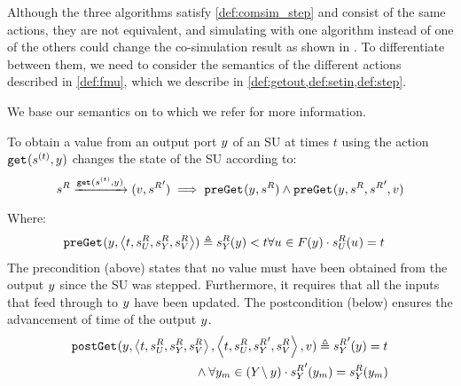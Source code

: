 Although the three algorithms satisfy \cref{def:comsim_step} and consist of the same actions, they are not equivalent, and simulating with one algorithm instead of one of the others could change the co-simulation result as shown in \cite{Gomes2019c,hansen_verification_2021}. 
To differentiate between them, we need to consider the semantics of the different actions described in \cref{def:fmu}, which we describe in \cref{def:getout,def:setin,def:step}.

We base our semantics on \cite{Gomes2019a,hansen_verification_2021} to which we refer for more information.

\begin{definition}\label{def:getout}   
  To obtain a value from an output port $y_{}$ of an SU at times $t$ using the action $\mathtt{get}_{}(s_{}^{(t)},y_{})$ changes the state of the SU according to:
  \begin{align*}
    s^{R}_{} 
    \xrightarrow[\text{}]{\mathtt{get}_{}(s_{}^{(t)}, y_{})} 
    (v,{s^{R}_{}}')
    \implies 
    \mathtt{preGet}_{}(y_{}, s^{R}_{})
    \land
    \mathtt{preGet}_{}(y_{}, s^{R}_{}, {s^{R}_{}}', v)
  \end{align*}
  Where:
  \begin{align*}
    &\mathtt{preGet}_{}(y_{},  \left\langle t,s^{R}_{U_{}}, s^{R}_{Y_{}}, s^{R}_{V} \right\rangle ) \triangleq
    s^{R}_{Y_{}}(y_{}) < t 
    \forall u_{} \in F(y_{}) \cdot s^{R}_{U_{}}(u_{}) = t 
  \end{align*}
  The precondition (above) states that no value must have been obtained from the output $y_{}$ since the SU was stepped.
  Furthermore, it requires that all the inputs that feed through to $y_{}$ have been updated.
  The postcondition (below) ensures the advancement of time of the output $y_{}$.
  \begin{align*}
    &\mathtt{postGet}_{}(y_{},  \left\langle t,s^{R}_{U_{}}, s^{R}_{Y_{}}, s^{R}_{V} \right\rangle , 
     \left\langle t,s^{R}_{U_{}}, {s^{R}_{Y_{}}}', s^{R}_{V} \right\rangle , v) \triangleq 
    {s^{R}_{Y_{}}}'(y_{}) = t \nonumber \\
    & \qquad \qquad \qquad \qquad \qquad 
    \land 
    \forall y_{m} \in (Y_{} \setminus y_{}) \cdot 
    {s^{R}_{Y_{}}}'(y_{m}) =
    s^{R}_{Y_{}}(y_{m})
  \end{align*}
\end{definition}


